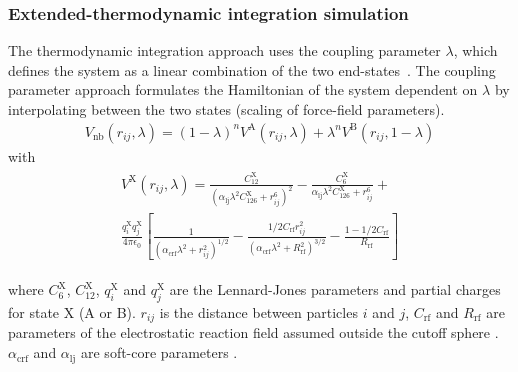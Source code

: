 \subsubsection{Extended-thermodynamic integration simulation} \label{chapt:exTI}
The thermodynamic integration approach uses the coupling parameter $\lambda$, which defines the system as a linear combination of the two end-states~\cite{kirkwood_TI}. The coupling parameter approach formulates the Hamiltonian of the system dependent on $\lambda$ by interpolating between the two states (scaling of force-field parameters). \\

\begin{align}
\label{equ:ext_ti}
V_{\text{nb}}(r_{ij},\lambda) = (1-\lambda)^n V^{\text{A}}(r_{ij},\lambda) + \lambda^n V^{\text{B}}(r_{ij},1-\lambda)
\end{align}
with
\begin{align}\begin{split}
V^{\text{X}}(r_{ij},\lambda) = \frac{C_{12}^{\text{X}}}{(\alpha_{\text{lj}}\lambda^2 C_{126}^{\text{X}} + r_{ij}^6)^2} - \frac{C_{6}^{\text{X}}}{\alpha_{\text{lj}}\lambda^2 C_{126}^{\text{X}} + r_{ij}^6} + \\
 \frac{q_i^{\text{X}} q_j^{\text{X}}}{4 \pi \epsilon_0} \left \lbrack \frac{1}{(\alpha_{\text{crf}}\lambda^2 + r_{ij}^2)^{1/2}} - \frac{1/2 C_{\text{rf}}r_{ij}^2}{(\alpha_{\text{crf}} \lambda^2 + R_{\text{rf}}^2)^{3/2}} - \frac{1 - 1/2C_{\text{rf}}}{R_{\text{rf}}} \right \rbrack
\end{split}\end{align}

\noindent where $C_{6}^{\text{X}}$, $C_{12}^{\text{X}}$, $q_i^{\text{X}}$ and $q_j^{\text{X}}$ are the Lennard-Jones parameters and partial charges for state X (A or B). $r_{ij}$ is the distance between particles $i$ and $j$, $C_{\text{rf}}$ and $R_{\text{rf}}$ are parameters of the electrostatic reaction field assumed outside the cutoff sphere \cite{Tironi1995}. 
$\alpha_{\text{crf}}$ and $\alpha_{\text{lj}}$ are soft-core parameters \cite{Beutler1994}. 

